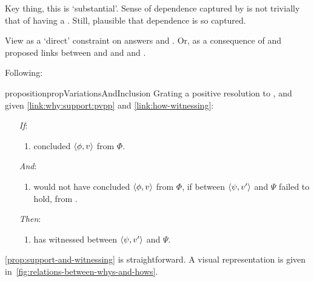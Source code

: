 \begin{note}
  \color{red}
  Key thing, this is `substantial'.
  Sense of dependence captured by \qWhyVnP{} is not trivially that of having a \wit{}.
  Still, plausible that dependence is so captured.
\end{note}

\begin{note}
  View \issueConstraint{} as a `direct' constraint on answers \qWhyVnP{} and \qWhy{}.
  Or, as a consequence of \issueInclusion{} and proposed links between \qWhy{} and \qWhyVnP{} and \qHowV{} and \qHow{}.
\end{note}

\begin{note}
 Following:

  \begin{restatable}[]{proposition}{propVariationsAndInclusion}
    \label{prop:support-and-witnessing}
    Grating a positive resolution to \issueInclusion{}, and given \autoref{link:why:support:pvpp} and \autoref{link:how-witnessing}:
    \begin{enumerate}
    \item[\emph{If}:]
      \begin{enumerate}[label=\alph*., ref=(\alph*)]
      \item \vAgent{} concluded \(\langle \phi, v \rangle\) from \(\Phi\).
      \end{enumerate}
    \item[\emph{And}:]
      \begin{enumerate}[label=\alph*., ref=(\alph*), resume]
      \item
        \vAgent{} would not have concluded \(\langle \phi, v \rangle\) from \(\Phi\), if \support{} between \(\langle \psi, v' \rangle\) and \(\Psi\) failed to hold, from .
      \end{enumerate}
    \item[\emph{Then}:]
      \begin{enumerate}[label=\alph*., ref=(\alph*), resume]
      \item
        \vAgent{} has witnessed \support{} between \(\langle \psi, v' \rangle\) and \(\Psi\).
      \end{enumerate}
    \end{enumerate}
  \end{restatable}

  \autoref{prop:support-and-witnessing} is straightforward.
  A visual representation is given in~\autoref{fig:relations-between-whys-and-hows}.
\end{note}

